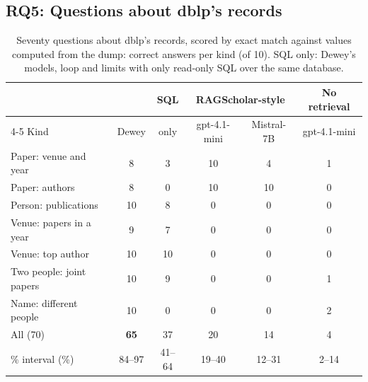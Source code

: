 \documentclass[conference]{IEEEtran}
\begin{document}
\subsection{RQ5: Questions about dblp's records}
\label{sec:rq5}

\begin{table}[t]
\caption{Seventy questions about dblp's records, scored by exact match against values computed from the
dump: correct answers per kind (of 10). SQL only: Dewey's models, loop and limits with only read-only SQL
over the same database.}
\label{tab:structured}
\centering\scriptsize
\setlength{\tabcolsep}{1.7pt}
\begin{tabular}{lccccc}
\toprule
 & & SQL & \multicolumn{2}{c}{RAGScholar-style} & No retrieval \\
\cmidrule(lr){4-5}
Kind & Dewey & only & gpt-4.1-mini & Mistral-7B & gpt-4.1-mini \\
\midrule
Paper: venue and year & 8 & 3 & 10 & 4 & 1 \\
Paper: authors & 8 & 0 & 10 & 10 & 0 \\
Person: publications & 10 & 8 & 0 & 0 & 0 \\
Venue: papers in a year & 9 & 7 & 0 & 0 & 0 \\
Venue: top author & 10 & 10 & 0 & 0 & 0 \\
Two people: joint papers & 10 & 9 & 0 & 0 & 1 \\
Name: different people & 10 & 0 & 0 & 0 & 2 \\
\midrule
All (70) & \textbf{65} & 37 & 20 & 14 & 4 \\
\quad 95\% interval (\%) & 84--97 & 41--64 & 19--40 & 12--31 & 2--14 \\
\bottomrule
\end{tabular}
\end{table}
\end{document}
